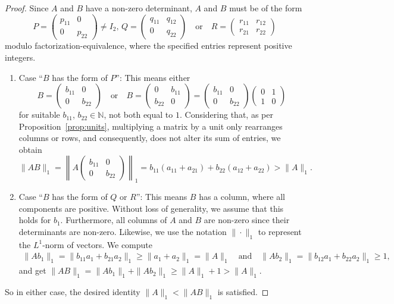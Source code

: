\begin{proof}
Since $A$ and $B$ have a non-zero determinant, $A$ and $B$ must be of the form 
\[ P = \begin{pmatrix} p_{11} & 0 \\ 0 & p_{22}\end{pmatrix} \neq I_2,\, Q = \begin{pmatrix} q_{11} & q_{12} \\ 0 & q_{22} \end{pmatrix} \quad \text{or} \quad R = \begin{pmatrix} r_{11} & r_{12} \\ r_{21} & r_{22} \end{pmatrix} \]
modulo factorization-equivalence, where the specified entries represent positive integers.
\begin{enumerate}[label=(\alph*)]
\item Case ``$B$ has the form of $P$'': This means either 
\[ B=\begin{pmatrix} b_{11} & 0 \\ 0 & b_{22} \end{pmatrix} \quad \text{or} \quad B=\begin{pmatrix} 0 & b_{11} \\ b_{22} & 0 \end{pmatrix} = \begin{pmatrix} b_{11} & 0 \\ 0 & b_{22} \end{pmatrix}  \begin{pmatrix} 0 & 1 \\ 1 & 0 \end{pmatrix}\]
for suitable $b_{11}$, $b_{22} \in \mathbb{N}$, not both equal to $1$. Considering that, as per Proposition~\ref{prop:units}, multiplying a matrix by a unit only rearranges columns or rows, and consequently, does not alter its sum of entries, we obtain
\[
\| AB \|_1 = \left\| A\begin{pmatrix} b_{11} & 0 \\ 0 & b_{22} \end{pmatrix} \right\|_1 = b_{11}(a_{11} + a_{21}) + b_{22}(a_{12} + a_{22}) > \| A \|_1.
\]
\item Case ``$B$ has the form of $Q$ or $R$'': This means $B$ has a column, where all components are positive. Without loss of generality, we assume that this holds for $b_1$. Furthermore, all columns of $A$ and $B$ are non-zero since their determinants are non-zero. Likewise, we use the notation $\| \cdot \|_1$ to represent the $L^1$-norm of vectors. We compute
\begin{align*}
\| Ab_1 \|_1  = \| b_{11}a_1 + b_{21}a_2 \|_1 \geq \|a_1 +a_2 \|_1 = \|A \|_1 \quad \text{and} \quad \| Ab_2 \|_1 = \| b_{12}a_1 + b_{22}a_2 \|_1 \geq 1,
\end{align*}
and get $\| AB \|_1 = \| Ab_1 \|_1 + \| Ab_2 \|_1 \geq \| A\|_1 +1 > \| A\|_1$.
\end{enumerate}
So in either case, the desired identity $\| A \|_1 < \| AB \|_1$ is satisfied.
\end{proof}

